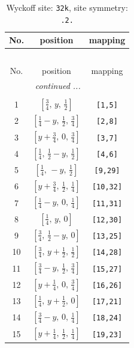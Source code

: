 \documentclass[fleqn,8pt]{jsarticle}
\begin{document}
\begin{longtable}{ccc}
\caption{Wyckoff site: {\tt 32k}, site symmetry: {\tt .2.}}
 \\
 \hline \hline
No. & position & mapping \\ \hline \endfirsthead

\multicolumn{2}{l}{\tablename\ \thetable{}} \\
 \hline \hline
No. & position & mapping \\ \hline \endhead

 \hline \hline
\multicolumn{2}{r}{\footnotesize\it continued ...} \\ \endfoot

 \hline \hline
\multicolumn{2}{r}{} \\ \endlastfoot

1 & $\left[ \frac{3}{4},\, y,\, \frac{1}{2} \right]$ & {\tt [1,5]} \\ \hline
2 & $\left[ \frac{1}{4} - y,\, \frac{1}{2},\, \frac{3}{4} \right]$ & {\tt [2,8]} \\ \hline
3 & $\left[ y + \frac{3}{4},\, 0,\, \frac{3}{4} \right]$ & {\tt [3,7]} \\ \hline
4 & $\left[ \frac{1}{4},\, \frac{1}{2} - y,\, \frac{1}{2} \right]$ & {\tt [4,6]} \\ \hline
5 & $\left[ \frac{1}{4},\, - y,\, \frac{1}{2} \right]$ & {\tt [9,29]} \\ \hline
6 & $\left[ y + \frac{3}{4},\, \frac{1}{2},\, \frac{1}{4} \right]$ & {\tt [10,32]} \\ \hline
7 & $\left[ \frac{1}{4} - y,\, 0,\, \frac{1}{4} \right]$ & {\tt [11,31]} \\ \hline
8 & $\left[ \frac{1}{4},\, y,\, 0 \right]$ & {\tt [12,30]} \\ \hline
9 & $\left[ \frac{3}{4},\, \frac{1}{2} - y,\, 0 \right]$ & {\tt [13,25]} \\ \hline
10 & $\left[ \frac{3}{4},\, y + \frac{1}{2},\, \frac{1}{2} \right]$ & {\tt [14,28]} \\ \hline
11 & $\left[ \frac{3}{4} - y,\, \frac{1}{2},\, \frac{3}{4} \right]$ & {\tt [15,27]} \\ \hline
12 & $\left[ y + \frac{1}{4},\, 0,\, \frac{3}{4} \right]$ & {\tt [16,26]} \\ \hline
13 & $\left[ \frac{1}{4},\, y + \frac{1}{2},\, 0 \right]$ & {\tt [17,21]} \\ \hline
14 & $\left[ \frac{3}{4} - y,\, 0,\, \frac{1}{4} \right]$ & {\tt [18,24]} \\ \hline
15 & $\left[ y + \frac{1}{4},\, \frac{1}{2},\, \frac{1}{4} \right]$ & {\tt [19,23]} \\ \hline

\end{longtable}
\end{document}
